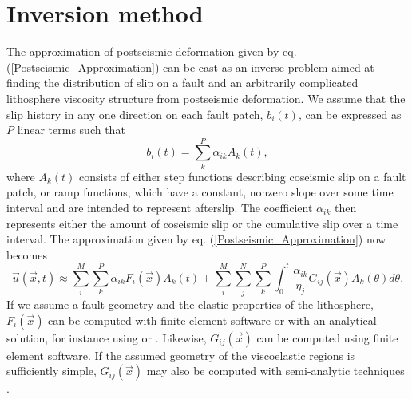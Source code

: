 \documentclass[extra]{gji}
\begin{document}
\section{Inversion method}
The approximation of postseismic deformation given by eq.
(\ref{Postseismic_Approximation}) can be cast as an inverse problem
aimed at finding the distribution of slip on a fault and an
arbitrarily complicated lithosphere viscosity structure from
postseismic deformation. We assume that the slip history in any one
direction on each fault patch, $b_i(t)$, can be expressed as $P$ linear
terms such that
\begin{equation}
  b_i(t) = \sum_k^P \alpha_{ik}A_k(t),
\end{equation}
where $A_k(t)$ consists of either step functions describing coseismic
slip on a fault patch, or ramp functions, which have a constant, nonzero slope
over some time interval and are intended to represent afterslip.
The coefficient $\alpha_{ik}$ then represents either the amount of coseismic slip or
the cumulative slip over a time interval.  The approximation given by
eq. (\ref{Postseismic_Approximation}) now becomes
\begin{equation}\label{Postseismic_Approximation2}
  \vec{u}(\vec{x},t) \approx
  \sum_i^M\sum_k^P\alpha_{ik}F_i(\vec{x})A_k(t) +
  \sum_i^M\sum_j^N\sum_k^P\int_0^t\frac{\alpha_{ik}}{\eta_j}G_{ij}(\vec{x})A_k(\theta)d\theta.
\end{equation}
If we assume a fault geometry and the elastic properties of the
lithosphere, $F_i(\vec{x})$ can be computed with finite element
software or with an analytical solution, for instance using
\citet{O1992} or \citet{M2007}. Likewise, $G_{ij}(\vec{x})$ can be
computed using finite element software.  If the assumed geometry of
the viscoelastic regions is sufficiently simple, $G_{ij}(\vec{x})$ may
also be computed with semi-analytic techniques
\citep[e.g.][]{P1997,FM2006,BF2010}.
\end{document}
